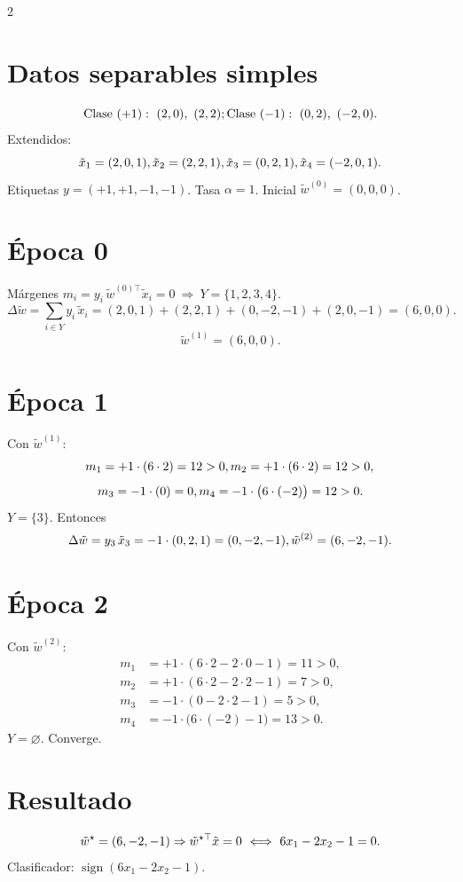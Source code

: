 \documentclass[11pt]{article}
\begin{document}
\begin{multicols}{2}
\section*{Datos separables simples}
\[
\text{Clase }(+1):\ (2,0),\ (2,2);\\
\text{Clase }(-1):\ (0,2),\ (-2,0).
\]
Extendidos:
\[
\tilde{x}_1=(2,0,1),\\ \tilde{x}_2=(2,2,1),\\
\tilde{x}_3=(0,2,1),\\ \tilde{x}_4=(-2,0,1).
\]
Etiquetas $y=(+1,+1,-1,-1)$. Tasa $\alpha=1$. Inicial $\tilde{w}^{(0)}=(0,0,0)$.

\section*{Época 0}
Márgenes $m_i=y_i\,\tilde{w}^{(0)\top}\tilde{x}_i=0\ \Rightarrow\ Y=\{1,2,3,4\}$.
\[
\Delta \tilde{w}=\sum_{i\in Y} y_i\,\tilde{x}_i
=(2,0,1)+(2,2,1)+(0,-2,-1)+(2,0,-1)=(6,0,0).
\]
\[
\tilde{w}^{(1)}=(6,0,0).
\]

\section*{Época 1}
Con $\tilde{w}^{(1)}$:
\[
m_1=+1\cdot(6\cdot2)=12>0,\\
m_2=+1\cdot(6\cdot2)=12>0,\\
\]
\[
m_3=-1\cdot(0)=0,\\
m_4=-1\cdot\bigl(6\cdot(-2)\bigr)=12>0.
\]
$Y=\{3\}$. Entonces
\[
\Delta \tilde{w}=y_3\,\tilde{x}_3=-1\cdot(0,2,1)=(0,-2,-1),
\\
\tilde{w}^{(2)}=(6,-2,-1).
\]

\section*{Época 2}
Con $\tilde{w}^{(2)}$:
\[
\begin{aligned}
m_1&=+1\cdot(6\cdot2-2\cdot0-1)=11>0,\\
m_2&=+1\cdot(6\cdot2-2\cdot2-1)=7>0,\\
m_3&=-1\cdot(0-2\cdot2-1)=5>0,\\
m_4&=-1\cdot\bigl(6\cdot(-2)-1\bigr)=13>0.
\end{aligned}
\]
$Y=\varnothing$. Converge.

\section*{Resultado}
\[
\tilde{w}^\star=(6,-2,-1)\\\Rightarrow\\
\tilde{w}^{\star\top}\tilde{x}=0\ \Longleftrightarrow\ 6x_1-2x_2-1=0.
\]
Clasificador: $\operatorname{sign}(6x_1-2x_2-1)$.


\end{multicols}
\end{document}
